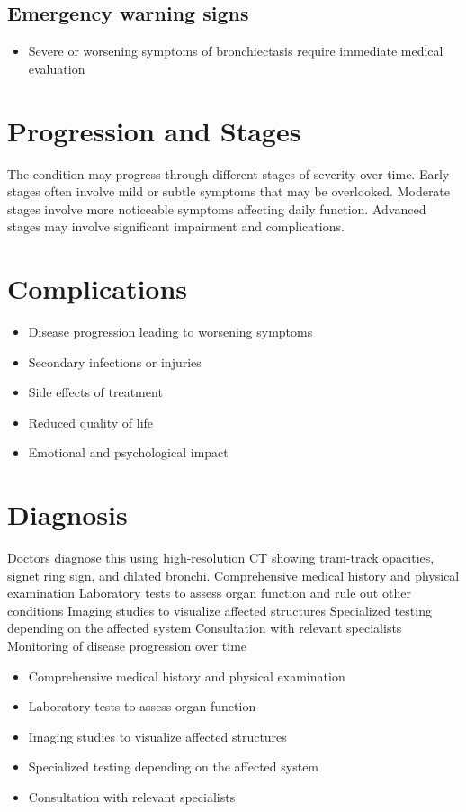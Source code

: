 \subsection{Emergency warning signs}
\begin{itemize}[noitemsep]
  \item Severe or worsening symptoms of bronchiectasis require immediate medical evaluation
\end{itemize}
\section{Progression and Stages}
The condition may progress through different stages of severity over time. Early stages often involve mild or subtle symptoms that may be overlooked. Moderate stages involve more noticeable symptoms affecting daily function. Advanced stages may involve significant impairment and complications.
\section{Complications}
\begin{itemize}[noitemsep]
  \item Disease progression leading to worsening symptoms
  \item Secondary infections or injuries
  \item Side effects of treatment
  \item Reduced quality of life
  \item Emotional and psychological impact
\end{itemize}
\section{Diagnosis}
Doctors diagnose this using high-resolution CT showing tram-track opacities, signet ring sign, and dilated bronchi. Comprehensive medical history and physical examination Laboratory tests to assess organ function and rule out other conditions Imaging studies to visualize affected structures Specialized testing depending on the affected system Consultation with relevant specialists Monitoring of disease progression over time

\begin{itemize}[noitemsep]
  \item Comprehensive medical history and physical examination
  \item Laboratory tests to assess organ function
  \item Imaging studies to visualize affected structures
  \item Specialized testing depending on the affected system
  \item Consultation with relevant specialists
\end{itemize}
